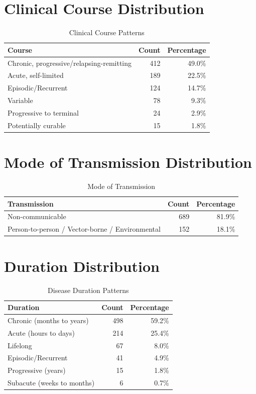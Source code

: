 \section{Clinical Course Distribution}
\label{sec:course_distribution}

\begin{table}[htbp]
\centering
\caption{Clinical Course Patterns}
\label{tab:course_dist}
\begin{tabular}{lrr}
\toprule
\textbf{Course} & \textbf{Count} & \textbf{Percentage} \\
\midrule
Chronic, progressive/relapsing-remitting & 412 & 49.0\% \\
Acute, self-limited & 189 & 22.5\% \\
Episodic/Recurrent & 124 & 14.7\% \\
Variable & 78 & 9.3\% \\
Progressive to terminal & 24 & 2.9\% \\
Potentially curable & 15 & 1.8\% \\
\bottomrule
\end{tabular}
\end{table}

\section{Mode of Transmission Distribution}
\label{sec:transmission_distribution}

\begin{table}[htbp]
\centering
\caption{Mode of Transmission}
\label{tab:transmission_dist}
\begin{tabular}{lrr}
\toprule
\textbf{Transmission} & \textbf{Count} & \textbf{Percentage} \\
\midrule
Non-communicable & 689 & 81.9\% \\
Person-to-person / Vector-borne / Environmental & 152 & 18.1\% \\
\bottomrule
\end{tabular}
\end{table}

\section{Duration Distribution}
\label{sec:duration_distribution}

\begin{table}[htbp]
\centering
\caption{Disease Duration Patterns}
\label{tab:duration_dist}
\begin{tabular}{lrr}
\toprule
\textbf{Duration} & \textbf{Count} & \textbf{Percentage} \\
\midrule
Chronic (months to years) & 498 & 59.2\% \\
Acute (hours to days) & 214 & 25.4\% \\
Lifelong & 67 & 8.0\% \\
Episodic/Recurrent & 41 & 4.9\% \\
Progressive (years) & 15 & 1.8\% \\
Subacute (weeks to months) & 6 & 0.7\% \\
\bottomrule
\end{tabular}
\end{table}

